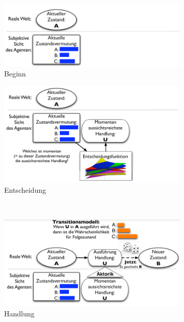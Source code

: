\begin{figure}[!ht]
	\centering 
	\begin{subfigure}{.45\textwidth}
		\includegraphics[width=\textwidth]{figures/ch08_pom.png}
		\caption{Beginn}
	\end{subfigure}
	\begin{subfigure}{.45\textwidth}
		\includegraphics[width=\textwidth]{figures/ch08_pom1.png}
		\caption{Entscheidung}
	\end{subfigure}\\
	\begin{subfigure}{.45\textwidth}
		\includegraphics[width=\textwidth]{figures/ch08_pom2.png}
		\caption{Handlung}
	\end{subfigure}
	\begin{subfigure}{.45\textwidth}

\end{subfigure}
\end{figure}

